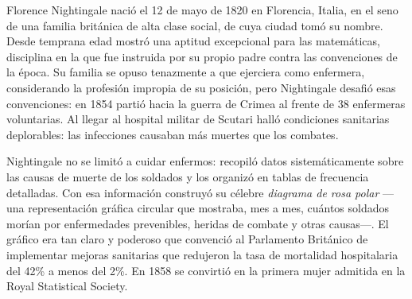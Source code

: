 \documentclass[11pt, letterpaper]{article}
\begin{document}
\begin{tcolorbox}[enhanced, breakable,
  colback=white, colframe=blockb, colbacktitle=blockb,
  coltitle=white, arc=4pt, leftrule=5pt,
  left=10pt, right=10pt, top=12pt, bottom=10pt,
  fonttitle=\bfseries,
  attach boxed title to top left={xshift=0.5cm, yshift*=-\tcboxedtitleheight/2},
  boxed title style={colframe=blockb, colback=blockb, arc=2pt},
  title={Florence Nightingale \hfill \normalfont\itshape 1820 --- 1910}]

\begin{minipage}[t]{0.18\linewidth}
\vspace{0pt}
\end{minipage}
\hfill
\begin{minipage}[t]{0.78\linewidth}
\vspace{0pt}

Florence Nightingale nació el 12 de mayo de 1820 en Florencia, Italia, en el seno de una familia británica de alta clase social, de cuya ciudad tomó su nombre. Desde temprana edad mostró una aptitud excepcional para las matemáticas, disciplina en la que fue instruida por su propio padre contra las convenciones de la época. Su familia se opuso tenazmente a que ejerciera como enfermera, considerando la profesión impropia de su posición, pero Nightingale desafió esas convenciones: en 1854 partió hacia la guerra de Crimea al frente de 38 enfermeras voluntarias. Al llegar al hospital militar de Scutari halló condiciones sanitarias deplorables: las infecciones causaban más muertes que los combates.

\medskip
Nightingale no se limitó a cuidar enfermos: recopiló datos sistemáticamente sobre las causas de muerte de los soldados y los organizó en tablas de frecuencia detalladas. Con esa información construyó su célebre \textit{diagrama de rosa polar} ---una representación gráfica circular que mostraba, mes a mes, cuántos soldados morían por enfermedades prevenibles, heridas de combate y otras causas---. El gráfico era tan claro y poderoso que convenció al Parlamento Británico de implementar mejoras sanitarias que redujeron la tasa de mortalidad hospitalaria del 42\% a menos del 2\%. En 1858 se convirtió en la primera mujer admitida en la Royal Statistical Society.


\end{minipage}
\end{tcolorbox}
\end{document}
